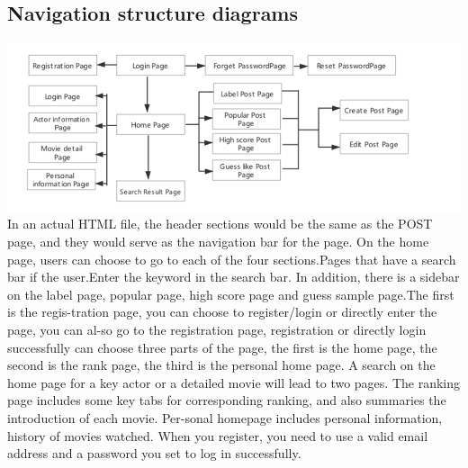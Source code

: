 \documentclass[12pt]{article}
\begin{document}
\subsection{Navigation structure diagrams}
\includegraphics[width=1\linewidth]{nav.png}\\
In an actual HTML file, the header sections would be the same as the POST page, and they would serve as the navigation bar for the page. On the home page, users can choose to go to each of the four sections.Pages that have a search bar if the user.Enter the keyword in the search bar. In addition, there is a sidebar on the label page, popular page, high score page and guess sample page.The first is the regis-tration page, you can choose to register/login or directly enter the page, you can al-so go to the registration page, registration or directly login successfully can choose three parts of the page, the first is the home page, the second is the rank page, the third is the personal home page. A search on the home page for a key actor or a detailed movie will lead to two pages. The ranking page includes some key tabs for corresponding ranking, and also summaries the introduction of each movie. Per-sonal homepage includes personal information, history of movies watched. When you register, you need to use a valid email address and a password you set to log in successfully.\\
\end{document}

